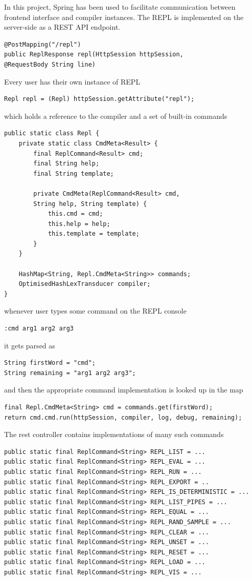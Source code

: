 In this project, Spring has been used to facilitate communication between frontend interface and compiler instances. The REPL is implemented on the server-side as a REST API endpoint. 
\begin{lstlisting}
@PostMapping("/repl")
public ReplResponse repl(HttpSession httpSession, 
@RequestBody String line)
\end{lstlisting}
Every user has their own instance of REPL
\begin{lstlisting}
Repl repl = (Repl) httpSession.getAttribute("repl");
\end{lstlisting}
which holds a reference to the compiler and a set of built-in commands
\begin{lstlisting}
public static class Repl {
    private static class CmdMeta<Result> {
        final ReplCommand<Result> cmd;
        final String help;
        final String template;
        
        private CmdMeta(ReplCommand<Result> cmd, 
        String help, String template) {
            this.cmd = cmd;
            this.help = help;
            this.template = template;
        }
    }
    
    HashMap<String, Repl.CmdMeta<String>> commands;
    OptimisedHashLexTransducer compiler;
}
\end{lstlisting}
whenever user types some command on the REPL console
\begin{lstlisting}
:cmd arg1 arg2 arg3
\end{lstlisting}
it gets parsed as
\begin{lstlisting}
String firstWord = "cmd";
String remaining = "arg1 arg2 arg3";
\end{lstlisting}
and then the appropriate command implementation is looked up in the map
\begin{lstlisting}
final Repl.CmdMeta<String> cmd = commands.get(firstWord);
return cmd.cmd.run(httpSession, compiler, log, debug, remaining);
\end{lstlisting}
The rest controller contains implementations of many such commands
\begin{lstlisting}
public static final ReplCommand<String> REPL_LIST = ...
public static final ReplCommand<String> REPL_EVAL = ...
public static final ReplCommand<String> REPL_RUN = ...
public static final ReplCommand<String> REPL_EXPORT = ..
public static final ReplCommand<String> REPL_IS_DETERMINISTIC = ...
public static final ReplCommand<String> REPL_LIST_PIPES = ...
public static final ReplCommand<String> REPL_EQUAL = ...
public static final ReplCommand<String> REPL_RAND_SAMPLE = ...
public static final ReplCommand<String> REPL_CLEAR = ...
public static final ReplCommand<String> REPL_UNSET = ...
public static final ReplCommand<String> REPL_RESET = ...
public static final ReplCommand<String> REPL_LOAD = ...
public static final ReplCommand<String> REPL_VIS = ...
\end{lstlisting}
